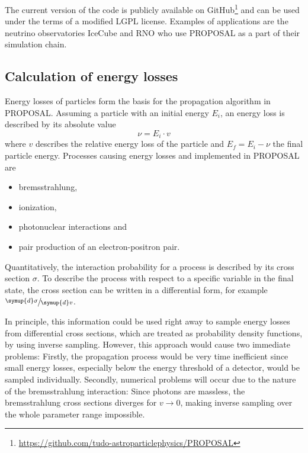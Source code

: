 The current version of the code is publicly available on GitHub\footnote{\url{https://github.com/tudo-astroparticlephysics/PROPOSAL}} and can be used under the terms of a modified LGPL license.
Examples of applications are the neutrino observatories IceCube and RNO who use PROPOSAL as a part of their simulation chain.

\subsection{Calculation of energy losses}
\label{sec:energy_loss_calculation}

Energy losses of particles form the basis for the propagation algorithm in PROPOSAL.
Assuming a particle with an initial energy $E_i$, an energy loss is described by its absolute value
\begin{equation}
	\nu = E_i \cdot v
\end{equation}
%
where $v$ describes the relative energy loss of the particle and $E_f = E_i - \nu$ the final particle energy.
Processes causing energy losses and implemented in PROPOSAL are
%
\begin{itemize}
	\item bremsstrahlung,
	\item ionization,
	\item photonuclear interactions and
	\item pair production of an electron-positron pair.
\end{itemize}
%
Quantitatively, the interaction probability for a process is described by its cross section $\sigma$.
To describe the process with respect to a specific variable in the final state, the cross section can be written in a differential form, for example $\sfrac{\symup{d}\sigma}{\symup{d}v}$.

In principle, this information could be used right away to sample energy losses from differential cross sections, which are treated as probability density functions, by using inverse sampling.
However, this approach would cause two immediate problems:
Firstly, the propagation process would be very time inefficient since small energy losses, especially below the energy threshold of a detector, would be sampled individually.
Secondly, numerical problems will occur due to the nature of the bremsstrahlung interaction:
Since photons are massless, the bremsstrahlung cross sections diverges for $v \to 0$, making inverse sampling over the whole parameter range impossible.

